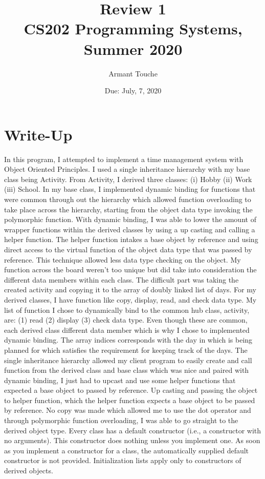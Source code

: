 \documentclass[11pt, a4paper]{article}
\title{\bf Review 1\\[1ex]
\rm\normalsize CS202 Programming Systems, Summer 2020 }
\date{\normalsize Due: July, 7, 2020}
\author{\normalsize Armant Touche}
\begin{document}
\vspace{0cm}\maketitle 

\section*{Write-Up}

In this program, I attempted to implement a time management system with Object Oriented Principles. I used a single inheritance hierarchy with my base class being Activity. From Activity, I derived three classes: (i) Hobby (ii) Work (iii) School. In my base class, I implemented dynamic binding for functions that were common through out the hierarchy which allowed function overloading to take place across the hierarchy, starting from the object data type invoking the polymorphic function. With dynamic binding, I was able to lower the amount of wrapper functions within the derived classes by using a up casting and calling a helper function. The helper function intakes a base object by reference and using direct access to the virtual function of the object data type that was passed by reference. This technique allowed less data type checking on the object. My function across the board weren't too unique but did take into consideration the different data members within each class. The difficult part was taking the created activity and copying it to the array of doubly linked list of days. For my derived classes, I have function like copy, display, read, and check data type. My list of function I chose to dynamically bind to the common hub class, activity, are: (1) read (2) display (3) check data type. Even though these are common, each derived class different data member which is why I chose to implemented dynamic binding. The array indices corresponds with the day in which is being planned for which satisfies the requirement for keeping track of the days. The single inheritance hierarchy allowed my client program to easily create and call function from the derived class and base class which was nice and paired with dynamic binding, I just had to upcast and use some helper functions that expected a base object to passed by reference. Up casting and passing the object to helper function, which the helper function expects a base object to be passed by reference. No copy was made which allowed me to use the dot operator and through polymorphic function overloading, I was able to go straight to the derived object type. Every class has a default constructor (i.e., a constructor with no arguments). This constructor does nothing unless you implement one. As soon as you implement a constructor for a class, the automatically supplied default constructor is not provided. Initialization lists apply only to constructors of derived objects.
\end{document}
